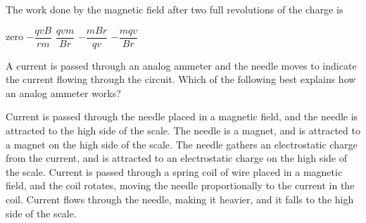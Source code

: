 \documentclass{../../oss-apphys-exam}
\begin{document}
\begin{questions}
  \question The work done by the magnetic field after two full revolutions of
  the charge is
  \begin{choices}
    \choice zero
    \choice $-\dfrac{qvB}{rm}$
    \choice $\dfrac{qvm}{Br}$
    \choice $-\dfrac{mBr}{qv}$
    \choice $-\dfrac{mqv}{Br}$
  \end{choices}
  \label{q:circ2}

  \newpage
  
  \question A current is passed through an analog ammeter and the needle moves
  to indicate the current flowing through the circuit. Which of the
  following best explains how an analog ammeter works?
  \begin{choices}
    \choice Current is passed through the needle placed in a magnetic field,
    and the needle is attracted to the high side of the scale.
    \choice The needle is a magnet, and is attracted to a magnet on the high
    side of the scale.
    \choice The needle gathers an electrostatic charge from the current, and
    is attracted to an electrostatic charge on the high side of the scale.
    \choice Current is passed through a spring coil of wire placed in a
    magnetic field, and the coil rotates, moving the needle proportionally to
    the current in the coil.
    \choice Current flows through the needle, making it heavier, and it falls
    to the high side of the scale.
  \end{choices}
  

\end{questions}
\end{document}
